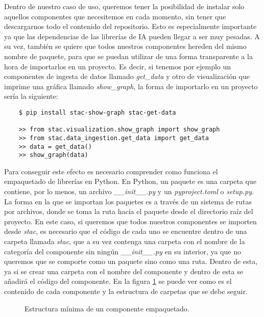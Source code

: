 Dentro de nuestro caso de uso, queremos tener la posibilidad de instalar
solo aquellos componentes que necesitemos en cada momento, sin tener que
descargarnos todo el contenido del repositorio. Esto es especialmente 
importante ya que las dependencias de las librerías de IA pueden llegar a
ser muy pesadas. A su vez, también se quiere que todos nuestros componentes
hereden del mismo nombre de paquete, para que se puedan utilizar de una forma
transparente a la hora de importarlos en un proyecto. Es decir, si tenemos por
ejemplo un componentes de ingesta de datos llamado \textit{get\_data} y otro de 
visualización que imprime una gráfica llamado \textit{show\_graph}, la forma de 
importarlo en un proyecto sería la siguiente:

\begin{verbatim}
    $ pip install stac-show-graph stac-get-data

    >> from stac.visualization.show_graph import show_graph
    >> from stac.data_ingestion.get_data import get_data
    >> data = get_data()
    >> show_graph(data)
\end{verbatim}

Para conseguir este efecto es necesario comprender como funciona el empaquetado
de librerías en Python. En Python, un paquete es una carpeta que contiene, por lo menos,
un archivo \textit{\_\_init\_\_.py} y un \textit{pyproject.toml} o \textit{setup.py}. 
La forma en la que se importan los paquetes es a través de un sistema de rutas por archivos, 
donde se toma la ruta hacia el paquete desde el directorio raíz del proyecto. En este caso,
si queremos que todos nuestros componentes se importen desde \textit{stac}, es necesario que
el código de cada uno se encuentre dentro de una carpeta llamada \textit{stac}, que a su vez
contenga una carpeta con el nombre de la categoría del componente sin ningún \textit{\_\_init\_\_.py} 
en su interior, ya que no queremos que se comporte como un paquete sino como una ruta.
Dentro de esta, ya si se crear una carpeta con el nombre del componente y dentro de esta
se añadirá el código del componente. En la figura \ref{fig:min-package} se puede ver 
como es el contenido de cada componente y la estructura de carpetas que se debe seguir.

\begin{figure}[ht]
    \caption{Estructura mínima de un componente empaquetado.}
    \label{fig:min-package}
\end{figure}

